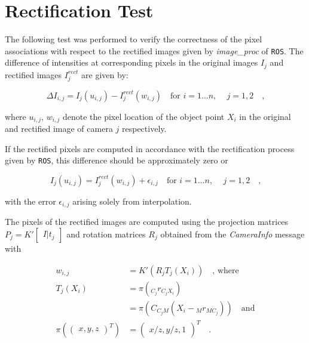 \section{Rectification Test}

The following test was performed to verify the correctness of the pixel
associations with respect to the rectified images given by \textit{image\_proc}
of \texttt{ROS}.
The difference of intensities at corresponding pixels in the original images $I_{j}$ and rectified images $I_{j}^{rect}$ are given by:

\begin{equation}
  \Delta I_{i,j} = I_j(u_{i,j}) - I_j^{rect}(w_{i,j}) 
  \hspace{1em} \text{for } i = 1 \ldots n \text{, } \hspace{1em} j = 1,2
  \hspace{1em}\text{,}
  \label{eqn:rect/I_def}
\end{equation}

where $u_{i,j}$, $w_{i,j}$ denote the pixel location of the object point $X_i$ in the
original and rectified image of camera $j$ respectively.

If the rectified pixels are computed in accordance with the rectification
process given by \texttt{ROS}, this difference should be
approximately zero or

\begin{equation}
  I_j(u_{i,j}) = I_j^{rect}(w_{i,j}) + \epsilon_{i,j} 
  \hspace{1em} \text{for } i = 1 \ldots n \text{, } \hspace{1em} j = 1,2
  \hspace{1em}\text{,}
  \label{eqn:rect/diffI_eq}
\end{equation}

with the error $\epsilon_{i,j}$ arising solely from interpolation.

The pixels of the rectified images are computed using the projection matrices
$P_{j} = K' \begin{bmatrix} I | t_j \end{bmatrix}$ and rotation matrices $R_j$ 
obtained from the \textit{CameraInfo} message with \cite{WikiCameraInfo}

\begin{align}
  w_{i,j} &= K'(R_j T_j(X_i)) \hspace{1em} \text{, where} \\
  T_j(X_i) &= \pi(_{C_j}r_{C_jX_i}) \\
           &= \pi(C_{C_j M} (X_i - {_M}r_{MC_j})) \hspace{1em} \text{and} \\
  \pi(\begin{pmatrix} x, y, z \end{pmatrix}^T) &= 
  \begin{pmatrix} x/z, y/z, 1 \end{pmatrix}^T 
  \hspace{1em}\text{.}
  \label{eqn:rect/utilde_def}
\end{align}

